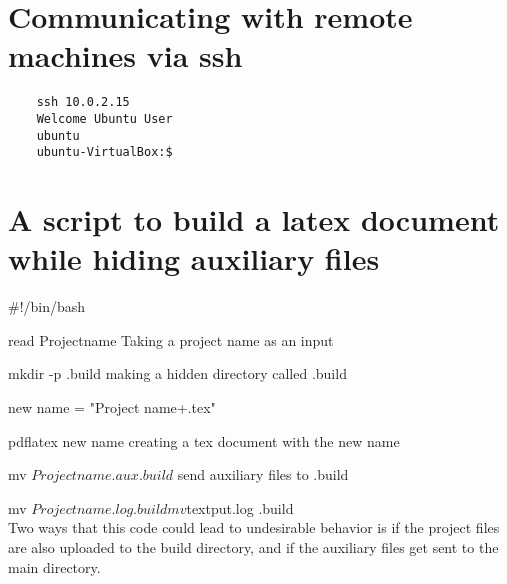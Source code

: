 \documentclass{article}
\title{CAAM 519, Homework #2:\LaTeX\ Submission}
\author{\textt{dac12}}
\date{September 30, 2021}
\begin{document}
\maketitle

\section{Communicating with remote machines via ssh}
\begin{verbatim}
    ssh 10.0.2.15
    Welcome Ubuntu User
    ubuntu
    ubuntu-VirtualBox:$
\end{verbatim}

\section{A script to build a latex document while hiding auxiliary files}

#!/bin/bash

read Projectname       \quad\quad Taking a project name as an input

mkdir -p .build         \quad\quad making a hidden directory called .build

new name = "Project name+.tex"      

pdflatex new name \quad\quad creating a tex document with the new name

mv $Projectname.aux .build$      \quad\quad send auxiliary files to .build

mv $Projectname.log .build

mv $textput.log .build\\

Two ways that this code could lead to undesirable behavior is if the project files are also uploaded to the build directory, and if the auxiliary files get sent to the main directory.
\end{document}

